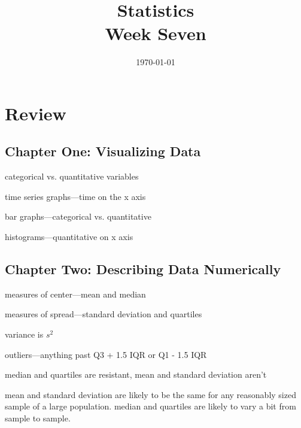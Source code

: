 \documentclass[landscape]{exam}
\title{Statistics \\ Week Seven}
\date{\today}
\author{}
\begin{document}
  \maketitle
  \tableofcontents

  \section{Review}
  \subsection{Chapter One: Visualizing Data}
  \begin{itemize*}
    \item categorical vs. quantitative variables
    \item time series graphs---time on the x axis
    \item bar graphs---categorical vs. quantitative
    \item histograms---quantitative on x axis
  \end{itemize*}

  \subsection{Chapter Two: Describing Data Numerically}
  \begin{itemize*}
    \item measures of center---mean and median
    \item measures of spread---standard deviation and quartiles
    \item variance is $s^2$
    \item outliers---anything past Q3 + 1.5 IQR or Q1 - 1.5 IQR
    \item median and quartiles are resistant, mean and standard deviation aren't
    \item mean and standard deviation are likely to be the same for any
      reasonably sized sample of a large population.  median and quartiles are
      likely to vary a bit from sample to sample.
  \end{itemize*}
\end{document}
